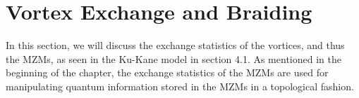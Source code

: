 \documentclass[11pt, oneside]{book}
\theoremstyle{break}
\theoremstyle{break}
\newcommand{\pd}{\partial}
\newcommand{\bmat}[1]{\begin{bmatrix} #1 \end{bmatrix}}
\begin{document}

\section{Vortex Exchange and Braiding}
In this section, we will discuss the exchange statistics of the vortices, and thus the MZMs, as seen in the Ku-Kane model in section 4.1. As mentioned in the beginning of the chapter, the exchange statistics of the MZMs are used for manipulating quantum information stored in the MZMs in a topological fashion.\\
\end{document}
